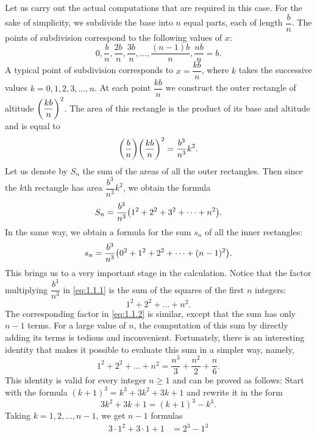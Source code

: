 \begin{note}
  Let us carry out the actual computations that are required in this case.
  For the sake of simplicity, we subdivide the base into \(n\) equal parts, each of length \(\dfrac{b}{n}\).
  The points of subdivision correspond to the following values of \(x\):
  \[
    0, \dfrac{b}{n}, \dfrac{2b}{n}, \dfrac{3b}{n}, \dots, \dfrac{(n - 1) b}{n}, \dfrac{nb}{n} = b.
  \]
  A typical point of subdivision corresponds to \(x = \dfrac{kb}{n}\), where \(k\) takes the successive values \(k = 0, 1, 2, 3, \dots, n\).
  At each point \(\dfrac{kb}{n}\) we construct the outer rectangle of altitude \(\left\lparen\dfrac{kb}{n}\right\rparen^2\).
  The area of this rectangle is the product of its base and altitude and is equal to
  \[
    \pa{\dfrac{b}{n}} \pa{\dfrac{kb}{n}}^2 = \dfrac{b^3}{n^3} k^2.
  \]
  Let us denote by \(S_n\) the sum of the areas of all the outer rectangles.
  Then since the \(k\)th rectangle has area \(\dfrac{b^3}{n^3} k^2\), we obtain the formula
  \begin{equation}\label{eq:1.1.1}
    S_n = \dfrac{b^3}{n^3} \pa{1^2 + 2^2 + 3^2 + \dots + n^2}.
  \end{equation}
  In the same way, we obtain a formula for the sum \(s_n\) of all the inner rectangles:
  \begin{equation}\label{eq:1.1.2}
    s_n = \dfrac{b^3}{n^3} \pa{0^2 + 1^2 + 2^2 + \dots + (n - 1)^2}.
  \end{equation}
  This brings us to a very important stage in the calculation.
  Notice that the factor multiplying \(\dfrac{b^3}{n^3}\) in \cref{eq:1.1.1} is the sum of the squares of the first \(n\) integers:
  \[
    1^2 + 2^2 + \dots + n^2.
  \]
  The corresponding factor in \cref{eq:1.1.2} is similar, except that the sum has only \(n - 1\) terms.
  For a large value of \(n\), the computation of this sum by directly adding its terms is tedious and inconvenient.
  Fortunately, there is an interesting identity that makes it possible to evaluate this sum in a simpler way, namely,
  \begin{equation}\label{eq:1.1.3}
    1^2 + 2^2 + \dots + n^2 = \dfrac{n^3}{3} + \dfrac{n^2}{2} + \dfrac{n}{6}.
  \end{equation}
  This identity is valid for every integer \(n \geq 1\) and can be proved as follows:
  Start with the formula \((k + 1)^3 = k^3 + 3 k^2 + 3k + 1\) and rewrite it in the form
  \[
    3 k^2 + 3k + 1 = (k + 1)^3 - k^3.
  \]
  Taking \(k = 1, 2, \dots, n - 1\), we get \(n - 1\) formulas
  \begin{align*}
    3 \cdot 1^2 + 3 \cdot 1 + 1             & = 2^3 - 1^3        \\

\end{align*}
\end{note}
